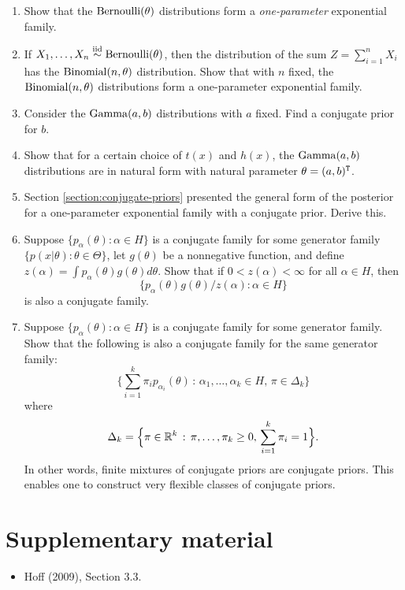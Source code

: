 \documentclass[12pt]{article}
\begin{document}
\begin{enumerate}
\item Show that the $\operatorname*{Bernoulli}(\theta)$ distributions form a \textit{one-parameter} exponential family.
\item If $X_1,\dotsc,X_n\stackrel{\mathrm{iid}}{\sim}\operatorname*{Bernoulli}(\theta)$, then the distribution of the sum $Z =\sum_{i = 1}^n X_i$ has the $\operatorname*{Binomial}(n,\theta)$ distribution. Show that with $n$ fixed, the $\operatorname*{Binomial}(n,\theta)$ distributions form a one-parameter exponential family.
\item Consider the $\operatorname*{Gamma}(a,b)$ distributions with $a$ fixed. Find a conjugate prior for $b$.
\item Show that for a certain choice of $t(x)$ and $h(x)$, the $\operatorname*{Gamma}(a,b)$ distributions are in natural form with natural parameter $\theta =(a,b)^{\mathtt{T}}$.
\item Section \ref{section:conjugate-priors} presented the general form of the posterior for a one-parameter exponential family with a conjugate prior. Derive this.
\item Suppose $\{p_\alpha(\theta):\alpha\in H\}$ is a conjugate family for some generator family $\{p(x|\theta):\theta\in\Theta\}$, let $g(\theta)$ be a nonnegative function, and define $z(\alpha) =\int p_\alpha(\theta) g(\theta) d\theta$.  Show that if $0<z(\alpha)<\infty$ for all $\alpha\in H$, then
$$\big\{p_\alpha(\theta)g(\theta)/z(\alpha) : \alpha\in H\big\}$$
is also a conjugate family.
\item Suppose $\{p_\alpha(\theta):\alpha\in H\}$ is a conjugate family for some generator family. Show that the following is also a conjugate family for the same generator family:
$$\Big\{\sum_{i = 1}^k \pi_i p_{\alpha_i}(\theta) \,:\, \alpha_1,\dotsc,\alpha_k\in H, \, \pi\in\Delta_k\Big\} $$
where
$$\Delta_k =\Big\{\pi\in\mathbb{R}^k\,:\,\pi,\dotsc,\pi_k\geq 0, \, \sum_{i = 1}^k \pi_i = 1\Big\}. $$
In other words, finite mixtures of conjugate priors are conjugate priors. This enables one to construct very flexible classes of conjugate priors.
\end{enumerate}








\section*{Supplementary material}

\begin{itemize}
\item Hoff (2009), Section 3.3.
\end{itemize}
\end{document}
